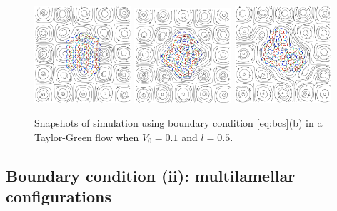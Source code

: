 \documentclass[aps,prl,preprint,groupedaddress]{revtex4-2}
\begin{document}
\begin{figure}
  \begin{center}
  \includegraphics[width=0.32\textwidth]{TG_0.png}
  \includegraphics[width=0.32\textwidth]{TG_2500.png}
  \includegraphics[width=0.32\textwidth]{TG_5000.png}
  \end{center}
  \vspace{-20pt}  
  \caption{\label{fig:TG_1} Snapshots of simulation using boundary condition \eqref{eq:bcs}(b) in a Taylor-Green flow when $V_0=0.1$ and $l=0.5$.}
\end{figure}
\subsection{Boundary condition (ii):  multilamellar configurations}
\end{document}
